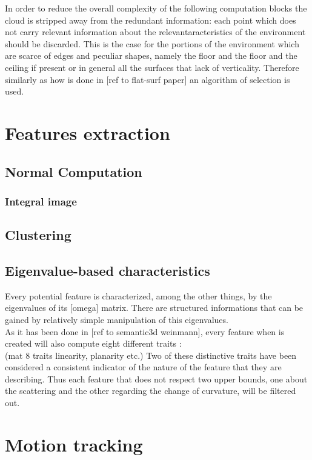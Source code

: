 In order to reduce the overall complexity of the following  computation blocks the cloud is stripped away from the redundant information: each point which does not carry relevant information about the relevantaracteristics of the environment should be discarded. This is the case for the portions of the environment which are scarce of edges and peculiar shapes, namely the floor and the floor and the ceiling if present or in general all the surfaces that lack of verticality. 
Therefore similarly as how is done in [ref to flat-surf paper] an algorithm of selection is used.


\section{Features extraction}

\subsection{Normal Computation}
  \subsubsection{Integral image}

\subsection{Clustering}


\subsection{Eigenvalue-based characteristics}
Every potential feature is characterized, among the other things, by the  eigenvalues  of its [omega] matrix. There are structured informations that can be gained by relatively simple manipulation of this eigenvalues.\\
As it has been done in [ref to semantic3d weinmann], every feature when is created will also compute eight different traits :\\
(mat 8 traits linearity, planarity etc.)
Two of these distinctive traits have been considered a consistent indicator of the nature of the feature that they are describing. Thus each feature that does not respect two upper bounds, one about the scattering and the other regarding the change of curvature, will be filtered out.



\section{Motion tracking}

